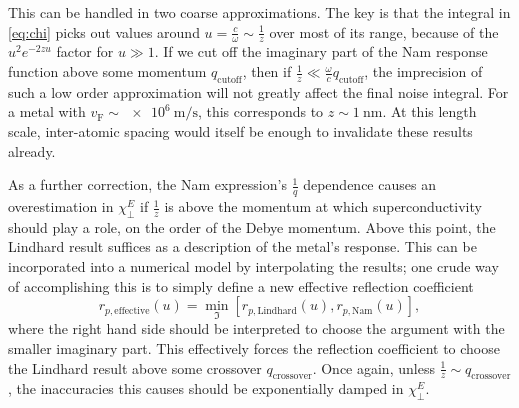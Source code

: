 \documentclass{article}
\newcommand{\vf}{v_{\mathrm{F}}}
\begin{document}
This can be handled in two coarse approximations.
The key is that the integral in \eqref{eq:chi} picks out values around $u = \frac{c}{\omega} \sim \frac{1}{z}$ over most of its range, because of the $u^2 e^{-2 z u}$ factor for $u \gg 1$.
If we cut off the imaginary part of the Nam response function above some momentum $q_{\mathrm{cutoff}}$, then if $\frac{1}{z} \ll \frac{\omega}{c} q_{\mathrm{cutoff}}$, the imprecision of such a low order approximation will not greatly affect the final noise integral.
For a metal with $\vf \sim \SI{e6}{\m\per\s}$, this corresponds to $z \sim \SI{1}{\nm}$.
At this length scale, inter-atomic spacing would itself be enough to invalidate these results already.

As a further correction, the Nam expression's $\frac{1}{q}$ dependence causes an overestimation in $\chi_\perp^E$ if $\frac{1}{z}$ is above the momentum at which superconductivity should play a role, on the order of the Debye momentum.
Above this point, the Lindhard result suffices as a description of the metal's response.
This can be incorporated into a numerical model by interpolating the results;
one crude way of accomplishing this is to simply define a new effective reflection coefficient
\begin{equation}
	r_{p, \mathrm{effective}}(u) = \min_{\Im}\left[r_{p, \mathrm{Lindhard}}\left(u\right), r_{p, \mathrm{Nam}}\left(u\right)\right],
\end{equation}
where the right hand side should be interpreted to choose the argument with the smaller imaginary part.
This effectively forces the reflection coefficient to choose the Lindhard result above some crossover $q_{\mathrm{crossover}}$.
Once again, unless $\frac{1}{z} \sim q_{\mathrm{crossover}}$, the inaccuracies this causes should be exponentially damped in $\chi_\perp^E$.
\end{document}
